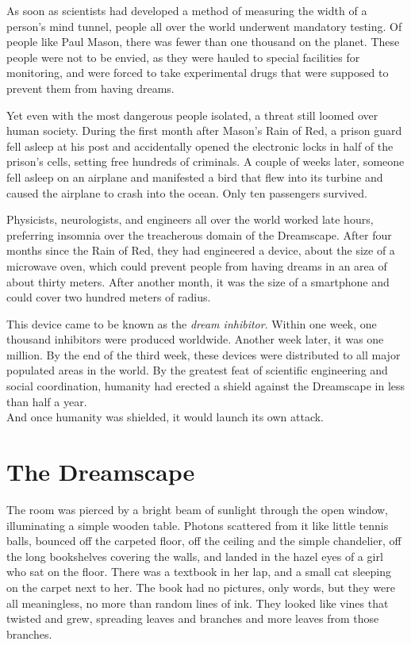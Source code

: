 \documentclass[openany, oneside]{book}
\begin{document}
As soon as scientists had developed a method of measuring the width of a person's mind tunnel, people all over the world underwent mandatory testing.
Of people like Paul Mason, there was fewer than one thousand on the planet.
These people were not to be envied, as they were hauled to special facilities for monitoring, and were forced to take experimental drugs that were supposed to prevent them from having dreams.

Yet even with the most dangerous people isolated, a threat still loomed over human society.
During the first month after Mason's Rain of Red, a prison guard fell asleep at his post and accidentally opened the electronic locks in half of the prison's cells, setting free hundreds of criminals.
A couple of weeks later, someone fell asleep on an airplane and manifested a bird that flew into its turbine and caused the airplane to crash into the ocean.
Only ten passengers survived.

Physicists, neurologists, and engineers all over the world worked late hours, preferring insomnia over the treacherous domain of the Dreamscape.
After four months since the Rain of Red, they had engineered a device, about the size of a microwave oven, which could prevent people from having dreams in an area of about thirty meters.
After another month, it was the size of a smartphone and could cover two hundred meters of radius.

This device came to be known as the \emph{dream inhibitor}. Within one week, one thousand inhibitors were produced worldwide.
Another week later, it was one million.
By the end of the third week, these devices were distributed to all major populated areas in the world.
By the greatest feat of scientific engineering and social coordination, humanity had erected a shield against the Dreamscape in less than half a year.\\

And once humanity was shielded, it would launch its own attack.

\chapter*{The Dreamscape}

The room was pierced by a bright beam of sunlight through the open window, illuminating a simple wooden table.
Photons scattered from it like little tennis balls, bounced off the carpeted floor, off the ceiling and the simple chandelier, off the long bookshelves covering the walls, and landed in the hazel eyes of a girl who sat on the floor.
There was a textbook in her lap, and a small cat sleeping on the carpet next to her.
The book had no pictures, only words, but they were all meaningless, no more than random lines of ink.
They looked like vines that twisted and grew, spreading leaves and branches and more leaves from those branches.
\end{document}
